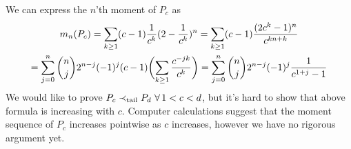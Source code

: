 \documentclass[a4paper]{scrreprt}
\begin{document}
\begin{ex}
\begin{enumerate}
            We can express the $n$'th moment of $P_c$ as
            \begin{multline*}
                m_n(P_c) 
                = \sum_{k \geq 1} (c-1) \frac{1}{c^k} (2-\frac{1}{c^k})^n
                = \sum_{k \geq 1} (c-1) \frac{(2c^k-1)^n}{c^{kn+k}} \\
                = \sum_{j=0}^n \binom{n}{j}2^{n-j}(-1)^j (c-1)\biggl(\sum_{k \geq 1}\frac{c^{-jk}}{c^k}\biggr)
                = \sum_{j=0}^n \binom{n}{j}2^{n-j}(-1)^j \frac{1}{c^{1+j}-1}
            \end{multline*}
            We would like to prove $P_c \prec_{\text{tail}} P_d ~ \forall\, 1 < c < d$, but it's hard to show that above formula is increasing with $c$.
            Computer calculations suggest that the moment sequence of $P_c$ increases pointwise as $c$ increases, however we have no rigorous argument yet.
          

\end{enumerate}
\end{ex}
\end{document}
